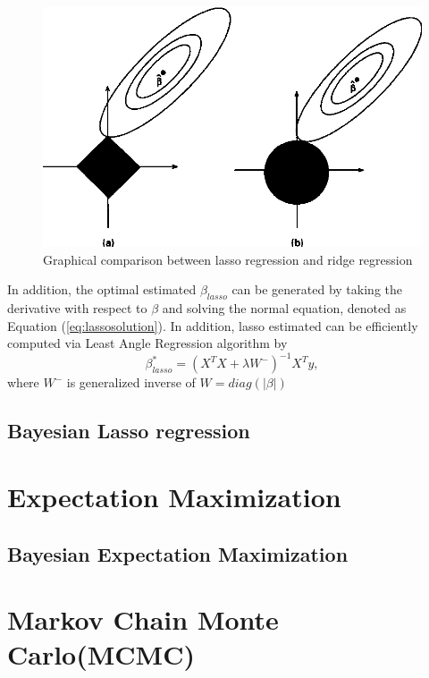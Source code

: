 \begin{figure}
	\includegraphics[width=\linewidth]{lassodemo}
	\caption{Graphical comparison between lasso regression and ridge regression}
	\label{fig:lassodemo}
\end{figure}
In addition, the optimal estimated $\beta_{lasso}$ can be generated by taking the derivative with respect to $\beta$ and solving the normal equation, denoted as Equation (\ref{eq:lassosolution}).
In addition, lasso estimated can be efficiently computed via Least Angle Regression algorithm by
\begin{equation}
	\label{eq:lassosolution}
	\beta_{lasso}^{*} = (X^TX + \lambda W^{-})^{-1} X^Ty,
\end{equation}
where $W^{-}$ is generalized inverse of $W = diag(|\beta|)$

\subsection{Bayesian Lasso regression}


\section{Expectation Maximization}
\subsection{Bayesian Expectation Maximization}

\section{Markov Chain Monte Carlo(MCMC)}
\label{MCMC}

